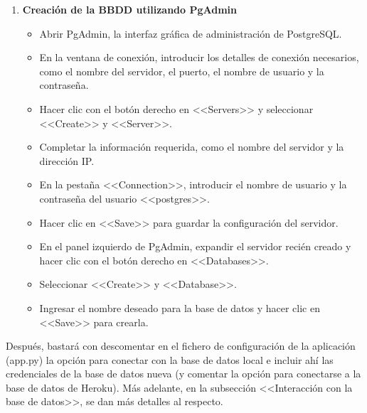 \begin{enumerate}
  \item \textbf{Creación de la BBDD utilizando PgAdmin}

  \begin{itemize}
    \item Abrir PgAdmin, la interfaz gráfica de administración de PostgreSQL.
    \item En la ventana de conexión, introducir los detalles de conexión necesarios, como el nombre del servidor, el puerto, el nombre de usuario y la contraseña.
    \item Hacer clic con el botón derecho en <<Servers>> y seleccionar <<Create>> y <<Server>>.
    \item Completar la información requerida, como el nombre del servidor y la dirección IP.
    \item En la pestaña <<Connection>>, introducir el nombre de usuario y la contraseña del usuario <<postgres>>.
    \item Hacer clic en <<Save>> para guardar la configuración del servidor.
    \item En el panel izquierdo de PgAdmin, expandir el servidor recién creado y hacer clic con el botón derecho en <<Databases>>.
    \item Seleccionar <<Create>> y <<Database>>.
    \item Ingresar el nombre deseado para la base de datos y hacer clic en <<Save>> para crearla.
  \end{itemize}

\end{enumerate}
Después, bastará con descomentar en el fichero de configuración de la aplicación (app.py) la opción para conectar con la base de datos local e incluir ahí las credenciales de la base de datos nueva (y comentar la opción para conectarse a la base de datos de Heroku). Más adelante, en la subsección <<Interacción con la base de datos>>, se dan más detalles al respecto.



